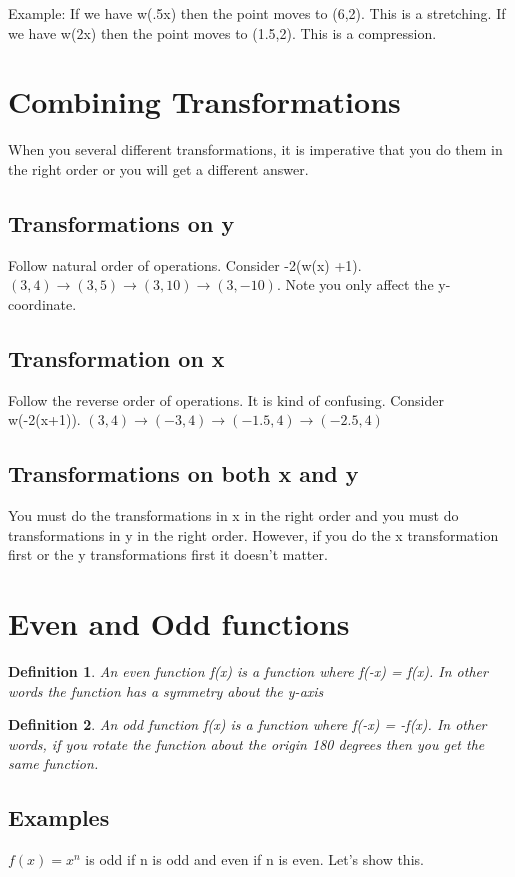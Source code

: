 \documentclass{tufte-handout}
\newtheorem{mydef}{Definition}
\begin{document}
Example: If we have w(.5x) then the point moves to (6,2).  This is a stretching.  If we have w(2x) then the point moves to (1.5,2). This is a compression.

\section{Combining Transformations}
When you several different transformations, it is imperative that you do them in the right order or you will get a different answer.
\subsection{Transformations on y}
Follow natural order of operations.  Consider -2(w(x) +1).  $(3,4) \rightarrow (3,5) \rightarrow (3,10) \rightarrow (3,-10)$.  Note you only affect the y-coordinate.
\subsection{Transformation on x}
Follow the reverse order of operations.  It is kind of confusing.  Consider w(-2(x+1)). $(3,4) \rightarrow (-3,4) \rightarrow (-1.5,4) \rightarrow (-2.5,4)$
\subsection{Transformations on both x and y}
You must do the transformations in x in the right order and you must do transformations in y in the right order.  However, if you do the x transformation first or the y transformations first it doesn't matter.

\section{Even and Odd functions}
\begin{mydef}
An even function f(x) is a function where f(-x) = f(x).  In other words the function has a symmetry about the y-axis
\end{mydef}
\begin{mydef}
An odd function f(x) is a function where f(-x) = -f(x). In other words, if you rotate the function about the origin 180 degrees then you get the same function.
\end{mydef}

\subsection{Examples}
$f(x) = x^n$ is odd if n is odd and even if n is even.  Let's show this.
\end{document}
